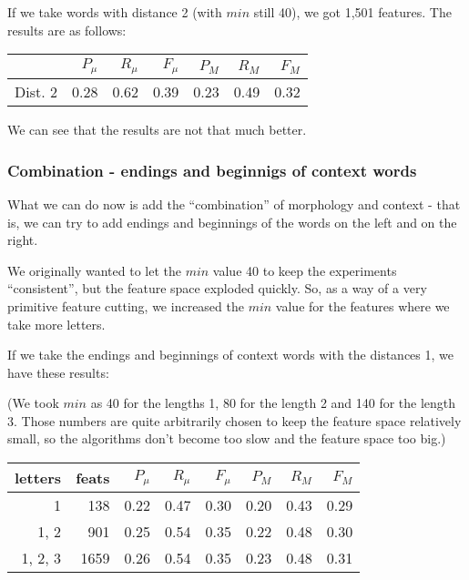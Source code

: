 \documentclass[letterpaper]{article}
\begin{document}
If we take words with distance 2 (with $min$ still 40), we got 1,501 features. The results are as follows:

\begin{table}[h]
\begin{tabular}{|r|r|r|r|r|r|r|}
 \hline
 & $P_\mu$ & $R_\mu$ & $F_\mu$ & $P_M$ & $R_M$  & $F_M$ \\ \hline
Dist. 2 & 0.28 & 0.62 & 0.39 & 0.23 & 0.49 & 0.32 \\ \hline
\end{tabular}
\end{table}

We can see that the results are not that much better.

\subsubsection{Combination - endings and beginnigs of context words}
What we can do now is add the ``combination'' of morphology and context - that is, 
we can try to add endings and beginnings of the words on the left and on the right.

We originally wanted to let the $min$ value 40 to keep the experiments ``consistent'',
but the feature space exploded quickly. So, as a way of a very primitive feature cutting,
we increased the $min$ value for the features where we take more letters.

If we take the endings and beginnings of context words with the distances 1, we have these results:

(We took $min$ as 40 for the lengths 1, 80 for the length 2 and 140 for the length 3. 
Those numbers are quite arbitrarily chosen to keep the feature space relatively small, 
so the algorithms don't become too slow and the feature space too big.)

\begin{table}[h]


\begin{tabular}{|r|r|r|r|r|r|r|r|}
\hline
letters&feats & $P_\mu$ & $R_\mu$ & $F_\mu$ & $P_M$ & $R_M$  & $F_M$ \\ \hline
1 & 138 & 0.22 & 0.47 & 0.30 & 0.20 & 0.43 & 0.29 \\ \hline
1, 2  & 901 & 0.25 & 0.54 & 0.35 & 0.22 & 0.48 & 0.30 \\ \hline
1, 2, 3  & 1659 & 0.26 & 0.54 & 0.35 & 0.23 & 0.48 & 0.31 \\ \hline

\end{tabular}
\end{table}
\end{document}
